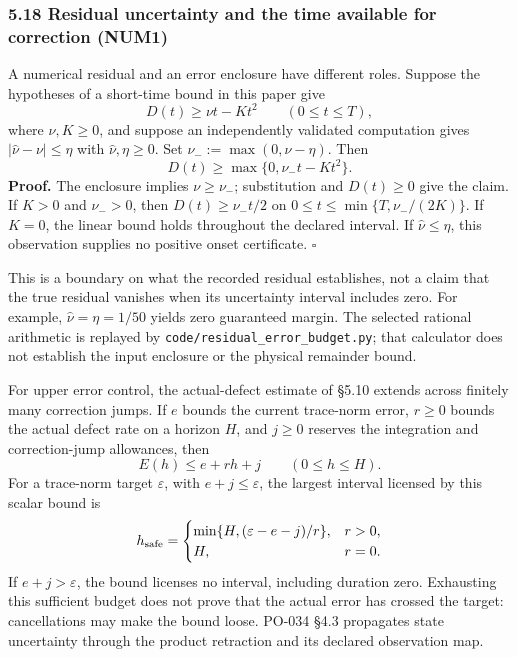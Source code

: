 \documentclass[
  11pt,
]{article}
\begin{document}
\subsubsection{5.18 Residual uncertainty and the time available for correction (NUM1)}\label{residual-uncertainty-and-the-time-available-for-correction-num1}

A numerical residual and an error enclosure have different roles. Suppose the hypotheses of a short-time bound in this paper give
\[
D(t)\ge \nu t-Kt^2\qquad(0\le t\le T),
\]
where \(\nu,K\ge0\), and suppose an independently validated computation gives
\(|\widehat\nu-\nu|\le\eta\) with \(\widehat\nu,\eta\ge0\).
Set \(\nu_-:=\max(0,\widehat\nu-\eta)\). Then
\[
D(t)\ge\max\{0,\nu_-t-Kt^2\}.
\]
\textbf{Proof.} The enclosure implies \(\nu\ge\nu_-\); substitution and \(D(t)\ge0\) give the claim. If \(K>0\) and \(\nu_->0\), then \(D(t)\ge\nu_-t/2\) on
\(0\le t\le\min\{T,\nu_-/(2K)\}\). If \(K=0\), the linear bound holds throughout the declared interval. If \(\widehat\nu\le\eta\), this observation supplies no positive onset certificate. \(\square\)

This is a boundary on what the recorded residual establishes, not a claim that the true residual vanishes when its uncertainty interval includes zero. For example, \(\widehat\nu=\eta=1/50\) yields zero guaranteed margin. The selected rational arithmetic is replayed by \texttt{code/residual\_error\_budget.py}; that calculator does not establish the input enclosure or the physical remainder bound.

For upper error control, the actual-defect estimate of §5.10 extends across finitely many correction jumps. If \(e\) bounds the current trace-norm error, \(r\ge0\) bounds the actual defect rate on a horizon \(H\), and \(j\ge0\) reserves the integration and correction-jump allowances, then
\[
E(h)\le e+rh+j\qquad(0\le h\le H).
\]
For a trace-norm target \(\varepsilon\), with \(e+j\le\varepsilon\), the largest interval licensed by this scalar bound is
\[
h_{\rm safe}=\begin{cases}
\min\{H,(\varepsilon-e-j)/r\},&r>0,\\
H,&r=0.
\end{cases}
\]
If \(e+j>\varepsilon\), the bound licenses no interval, including duration zero. Exhausting this sufficient budget does not prove that the actual error has crossed the target: cancellations may make the bound loose. PO-034 §4.3 propagates state uncertainty through the product retraction and its declared observation map.
\end{document}
